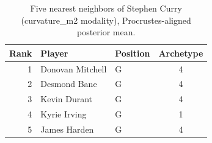 \begin{table}[htbp]
  \centering\small
  \begin{tabular}{rllc}
    \toprule
    Rank & Player & Position & Archetype \\
    \midrule
    1 & Donovan Mitchell & G & 4 \\
    2 & Desmond Bane & G & 4 \\
    3 & Kevin Durant & G & 4 \\
    4 & Kyrie Irving & G & 1 \\
    5 & James Harden & G & 4 \\
    \bottomrule
  \end{tabular}
  \caption{Five nearest neighbors of Stephen Curry (curvature_m2 modality), Procrustes-aligned posterior mean.}
  \label{tab:Stephen_Curry_neighbors_curvature_m2}
\end{table}

